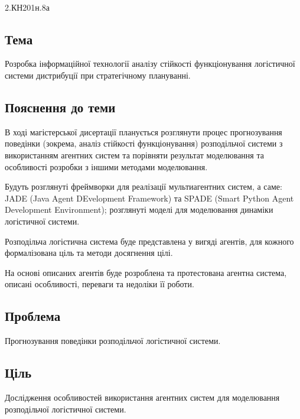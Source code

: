 


\usepackage{titling}




\Ukrainian

\begin{flushright}
	\textbf{\theauthor}\\
	2.КН201н.8а
\end{flushright}

\subsection*{Тема}
Розробка інформаційної технології аналізу стійкості функціонування логістичної системи дистрибуції при стратегічному плануванні.

\subsection*{Пояснення до теми}
В ході магістерської дисертації планується розглянути процес прогнозування поведінки (зокрема, аналіз стійкості функціонування) розподільчої системи з використанням агентних систем та порівняти результат моделювання та особливості розробки з іншими методами моделювання.

Будуть розглянуті фреймворки для реалізації мультиагентних систем, а саме: JADE (Java Agent DEvelopment Framework) та SPADE (Smart Python Agent Development Environment); розглянуті моделі для моделювання динаміки логістичної системи.  

Розподільча логістична система буде представлена у вигяді агентів, для кожного формалізована ціль та методи досягнення цілі. 

На основі описаних агентів буде розроблена та протестована агентна система, описані особливості, переваги та недоліки її роботи. 

\subsection*{Проблема}
Прогнозування поведінки розподільчої логістичної системи.  

\subsection*{Ціль}
Дослідження особливостей використання агентних систем для моделювання розподільчої логістичної системи. 

